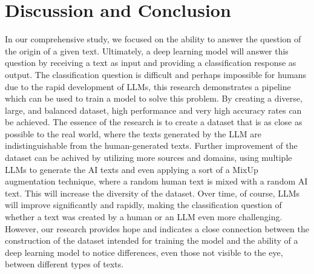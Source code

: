 \documentclass[11pt]{article}
\begin{document}
\section{Discussion and Conclusion}
In our comprehensive study, we focused on the ability to answer the question of the origin of a given text. Ultimately, a deep learning model will answer this question by receiving a text as input and providing a classification response as output. The classification question is difficult and perhaps impossible for humans due to the rapid development of LLMs, this research demonstrates a pipeline which can be used to train a model to solve this problem. By creating a diverse, large, and balanced dataset, high performance and very high accuracy rates can be achieved.
The essence of the research is to create a dataset that is as close as possible to the real world, where the texts generated by the LLM are indistinguishable from the human-generated texts. Further improvement of the dataset can be achived by utilizing more sources and domains, using multiple LLMs to generate the AI texts and even applying a sort of a MixUp augmentation technique, where a random human text is mixed with a random AI text. This will increase the diversity of the dataset.
Over time, of course, LLMs will improve significantly and rapidly, making the classification question of whether a text was created by a human or an LLM even more challenging. However, our research provides hope and indicates a close connection between the construction of the dataset intended for training the model and the ability of a deep learning model to notice differences, even those not visible to the eye, between different types of texts.



\end{document}
